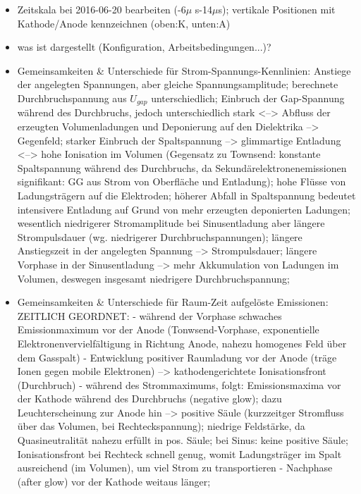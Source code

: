\documentclass[a4paper,10pt,twoside]{article}
\begin{document}
		\begin{itemize}
			\item Zeitskala bei 2016-06-20 bearbeiten (-6$\mu$ s-14$\mu$s); vertikale Positionen mit Kathode/Anode kennzeichnen (oben:K, unten:A)
			\item was ist dargestellt (Konfiguration, Arbeitsbedingungen...)?
			\item Gemeinsamkeiten \& Unterschiede für Strom-Spannungs-Kennlinien: Anstiege der angelegten Spannungen, aber gleiche Spannungsamplitude; berechnete Durchbruchspannung aus $U_{gap}$ unterschiedlich; Einbruch der Gap-Spannung während des Durchbruchs, jedoch unterschiedlich stark <--> Abfluss der erzeugten Volumenladungen und Deponierung auf den Dielektrika --> Gegenfeld; starker Einbruch der Spaltspannung --> glimmartige Entladung <--> hohe Ionisation im Volumen (Gegensatz zu Townsend: konstante Spaltspannung während des Durchbruchs, da Sekundärelektronenemissionen signifikant: GG aus Strom von Oberfläche und Entladung); hohe Flüsse von Ladungsträgern auf die Elektroden; höherer Abfall in Spaltspannung bedeutet intensivere Entladung auf Grund von mehr erzeugten deponierten Ladungen; wesentlich niedrigerer Stromamplitude bei Sinusentladung aber längere Strompulsdauer (wg. niedrigerer Durchbruchspannungen); längere Anstiegszeit in der angelegten Spannung --> Strompulsdauer; längere Vorphase in der Sinusentladung --> mehr Akkumulation von Ladungen im Volumen, deswegen insgesamt niedrigere Durchbruchspannung; 
			\item Gemeinsamkeiten \& Unterschiede für Raum-Zeit aufgelöste Emissionen:
					ZEITLICH GEORDNET:	- während der Vorphase schwaches Emissionmaximum vor der Anode (Tonwsend-Vorphase, exponentielle Elektronenvervielfältigung in Richtung Anode, nahezu homogenes Feld über dem Gasspalt)
															- Entwicklung positiver Raumladung vor der Anode (träge Ionen gegen mobile Elektronen) --> kathodengerichtete Ionisationsfront (Durchbruch) 
															- während des Strommaximums, folgt: Emissionsmaxima vor der Kathode während des Durchbruchs (negative glow); dazu Leuchterscheinung zur Anode hin --> positive Säule (kurzzeitger Stromfluss über das Volumen, bei Rechteckspannung); niedrige Feldstärke, da Quasineutralität nahezu erfüllt in pos. Säule;  bei Sinus: keine positive Säule; Ionisationsfront bei Rechteck schnell genug, womit Ladungsträger im Spalt ausreichend (im Volumen), um viel Strom zu transportieren 
															- Nachphase (after glow) vor der Kathode weitaus länger;  
		\end{itemize}
		
\end{document}
